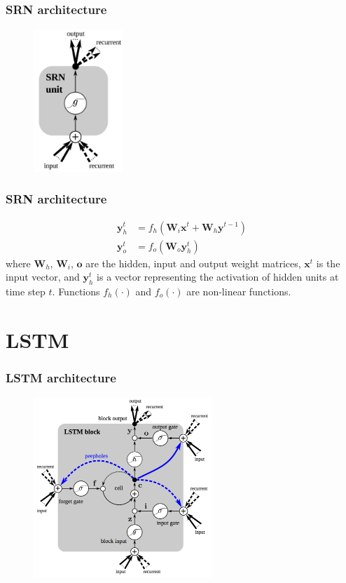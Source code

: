 \documentclass{beamer}
\begin{document}
\begin{frame}
  \frametitle{SRN architecture}
  
  \begin{figure}
    \centering
    \includegraphics[width=0.3\textwidth]{srn_architecture.png}
  \end{figure}
\end{frame}

\begin{frame}
  \frametitle{SRN architecture}

  \begin{align*}
    \mathbf{y}_{h}^{t}&=f_{h}(\mathbf{W}_{i}\mathbf{x}^{t}+\mathbf{W}_{h}\mathbf{y}^{t-1}) \\
    \mathbf{y}_{o}^{t}&=f_{o}(\mathbf{W}_{o}\mathbf{y}_{h}^{t})
  \end{align*}
  where $\mathbf{W}_{h}$, $\mathbf{W}_{i}$, $\mathbf{o}$ are the hidden, input and output weight matrices, $\mathbf{x}^{t}$ is the input vector, and $\mathbf{y}_{h}^{t}$ is a vector representing the activation of hidden units at time step $t$. Functions $f_{h}(\cdot)$ and $f_{o}(\cdot)$ are non-linear functions.
\end{frame}

\section{LSTM}

\begin{frame}
  \frametitle{LSTM architecture}
  
  \begin{figure}
    \centering
    \includegraphics[width=0.6\textwidth]{lstm_architecture.png}
  \end{figure}
\end{frame}
\end{document}
